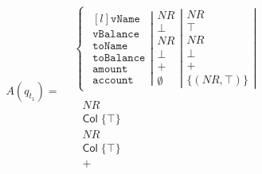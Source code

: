 \begin{align}
    A(q_{t_1})=
    \begin{split}
        &\left\{\begin{matrix}
                   \left.\begin{matrix*}[l]
                             \texttt{vName}\\
                             \texttt{vBalance}\\
                             \texttt{toName}\\
                             \texttt{toBalance}\\
                             \texttt{amount}\\
                             \texttt{account}
                   \end{matrix*}\right|
                   \left.\begin{matrix}
                             NR\\
                             \bot\\
                             NR\\
                             \bot\\
                             +\\
                             \emptyset
                   \end{matrix}\right|
                   \left.\begin{matrix}
                             NR\\
                             \top\\
                             NR\\
                             \bot\\
                             +\\
                             \{(NR, \top)\}
                   \end{matrix}\right|
        \end{matrix}\right. \\
        &\left.\begin{matrix}
                  \left.\begin{matrix}
                            NR\\
                            \mathsf{Col} \; \{\top\}\\
                            NR\\
                            \mathsf{Col} \; \{\top\}\\
                            +\\

\end{matrix}
\end{matrix}
\end{split}
\end{align}
